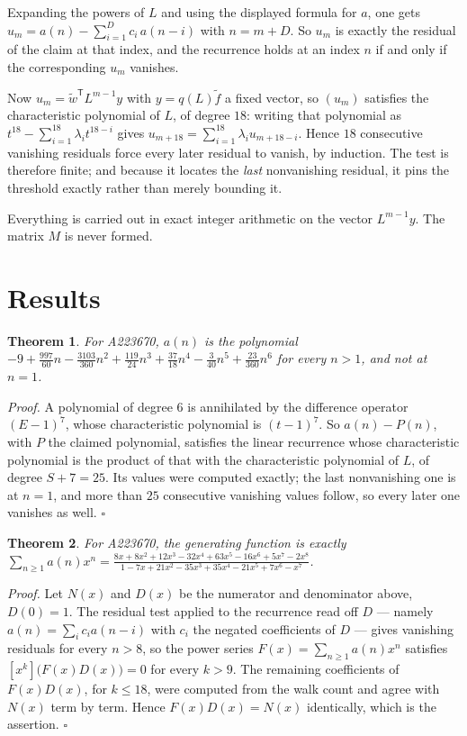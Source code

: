 \documentclass[11pt]{article}
\newtheorem{theorem}{Theorem}
\theoremstyle{definition}
\begin{document}
Expanding the powers of $L$ and using the displayed formula for $a$, one gets $u_m = a(n) - \sum_{i=1}^{D} c_i\,a(n-i)$ with $n = m + D$. So $u_m$ is exactly the residual of the claim at that index, and the recurrence holds at an index $n$ if and only if the corresponding $u_m$ vanishes.

Now $u_m = \tilde w^{\mathsf T} L^{m-1} y$ with $y = q(L)\tilde f$ a fixed vector, so $(u_m)$ satisfies the characteristic polynomial of $L$, of degree $18$: writing that polynomial as $t^{18} - \sum_{i=1}^{18} \lambda_i t^{18-i}$ gives $u_{m+18} = \sum_{i=1}^{18} \lambda_i u_{m+18-i}$. Hence $18$ consecutive vanishing residuals force every later residual to vanish, by induction. The test is therefore finite; and because it locates the {\itshape last} nonvanishing residual, it pins the threshold exactly rather than merely bounding it.

Everything is carried out in exact integer arithmetic on the vector $L^{m-1}y$. The matrix $M$ is never formed.

\section{Results}

\begin{theorem} For A223670, $a(n)$ is the polynomial $-9 + \frac{997}{60}n - \frac{3103}{360}n^{2} + \frac{119}{24}n^{3} + \frac{37}{18}n^{4} - \frac{3}{40}n^{5} + \frac{23}{360}n^{6}$ for every $n > 1$, and not at $n = 1$.\end{theorem}

{\itshape Proof.} A polynomial of degree $6$ is annihilated by the difference operator $(E-1)^{7}$, whose characteristic polynomial is $(t-1)^{7}$. So $a(n) - P(n)$, with $P$ the claimed polynomial, satisfies the linear recurrence whose characteristic polynomial is the product of that with the characteristic polynomial of $L$, of degree $S + 7 = 25$. Its values were computed exactly; the last nonvanishing one is at $n = 1$, and more than $25$ consecutive vanishing values follow, so every later one vanishes as well. $\square$

\begin{theorem} For A223670, the generating function is exactly $\sum_{n\ge 1} a(n)x^n = \frac{8x + 8x^{2} + 12x^{3} - 32x^{4} + 63x^{5} - 16x^{6} + 5x^{7} - 2x^{8}}{1 - 7x + 21x^{2} - 35x^{3} + 35x^{4} - 21x^{5} + 7x^{6} - x^{7}}$.\end{theorem}

{\itshape Proof.} Let $N(x)$ and $D(x)$ be the numerator and denominator above, $D(0)=1$. The residual test applied to the recurrence read off $D$ --- namely $a(n) = \sum_i c_i a(n-i)$ with $c_i$ the negated coefficients of $D$ --- gives vanishing residuals for every $n > 8$, so the power series $F(x)=\sum_{n\ge 1}a(n)x^n$ satisfies $[x^k]\bigl(F(x)D(x)\bigr) = 0$ for every $k > 9$. The remaining coefficients of $F(x)D(x)$, for $k \le 18$, were computed from the walk count and agree with $N(x)$ term by term. Hence $F(x)D(x) = N(x)$ identically, which is the assertion. $\square$
\end{document}
